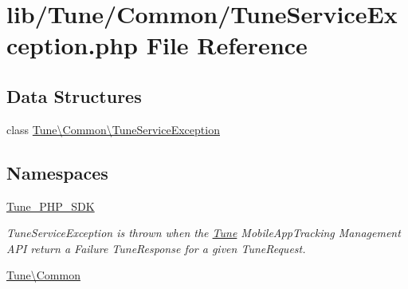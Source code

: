\hypertarget{TuneServiceException_8php}{\section{lib/\-Tune/\-Common/\-Tune\-Service\-Exception.php File Reference}
\label{TuneServiceException_8php}
}
\subsection*{Data Structures}
\begin{DoxyCompactItemize}
\item 
class \hyperlink{classTune_1_1Common_1_1TuneServiceException}{Tune\textbackslash{}\-Common\textbackslash{}\-Tune\-Service\-Exception}
\end{DoxyCompactItemize}
\subsection*{Namespaces}
\begin{DoxyCompactItemize}
\item 
\hyperlink{namespaceTune__PHP__SDK}{Tune\-\_\-\-P\-H\-P\-\_\-\-S\-D\-K}
\begin{DoxyCompactList}\small\item\em Tune\-Service\-Exception is thrown when the \hyperlink{namespaceTune}{Tune} Mobile\-App\-Tracking Management A\-P\-I return a Failure Tune\-Response for a given Tune\-Request. \end{DoxyCompactList}\item 
\hyperlink{namespaceTune_1_1Common}{Tune\textbackslash{}\-Common}
\end{DoxyCompactItemize}

